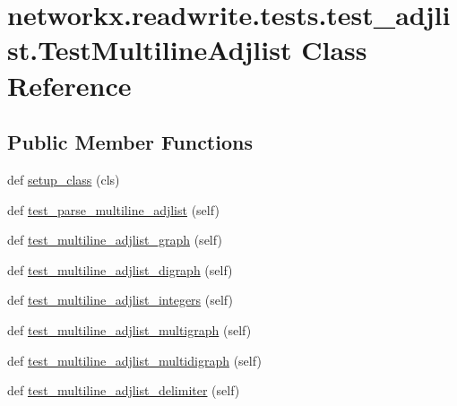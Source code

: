 \hypertarget{classnetworkx_1_1readwrite_1_1tests_1_1test__adjlist_1_1TestMultilineAdjlist}{}\section{networkx.\+readwrite.\+tests.\+test\+\_\+adjlist.\+Test\+Multiline\+Adjlist Class Reference}
\label{classnetworkx_1_1readwrite_1_1tests_1_1test__adjlist_1_1TestMultilineAdjlist}
\subsection*{Public Member Functions}
\begin{DoxyCompactItemize}
\item 
def \hyperlink{classnetworkx_1_1readwrite_1_1tests_1_1test__adjlist_1_1TestMultilineAdjlist_af7e92eeaa04d918ea3ace69a509c7255}{setup\+\_\+class} (cls)
\item 
def \hyperlink{classnetworkx_1_1readwrite_1_1tests_1_1test__adjlist_1_1TestMultilineAdjlist_a3ec2e558232ee15198b3625f9687d15a}{test\+\_\+parse\+\_\+multiline\+\_\+adjlist} (self)
\item 
def \hyperlink{classnetworkx_1_1readwrite_1_1tests_1_1test__adjlist_1_1TestMultilineAdjlist_a79c6d3fece8b574b2bf8b706827e2799}{test\+\_\+multiline\+\_\+adjlist\+\_\+graph} (self)
\item 
def \hyperlink{classnetworkx_1_1readwrite_1_1tests_1_1test__adjlist_1_1TestMultilineAdjlist_a779c16424b10fc96d134c1168a123c8e}{test\+\_\+multiline\+\_\+adjlist\+\_\+digraph} (self)
\item 
def \hyperlink{classnetworkx_1_1readwrite_1_1tests_1_1test__adjlist_1_1TestMultilineAdjlist_a0779b84ca778391f97684bfb534911e8}{test\+\_\+multiline\+\_\+adjlist\+\_\+integers} (self)
\item 
def \hyperlink{classnetworkx_1_1readwrite_1_1tests_1_1test__adjlist_1_1TestMultilineAdjlist_af28b72e3e38346f9c7c31f11669cf031}{test\+\_\+multiline\+\_\+adjlist\+\_\+multigraph} (self)
\item 
def \hyperlink{classnetworkx_1_1readwrite_1_1tests_1_1test__adjlist_1_1TestMultilineAdjlist_aa48e7fc62fad4ff0e24d8bc97f2ddadd}{test\+\_\+multiline\+\_\+adjlist\+\_\+multidigraph} (self)
\item 
def \hyperlink{classnetworkx_1_1readwrite_1_1tests_1_1test__adjlist_1_1TestMultilineAdjlist_abc1432f6f1a24667619f2bfa3535aad8}{test\+\_\+multiline\+\_\+adjlist\+\_\+delimiter} (self)
\end{DoxyCompactItemize}
